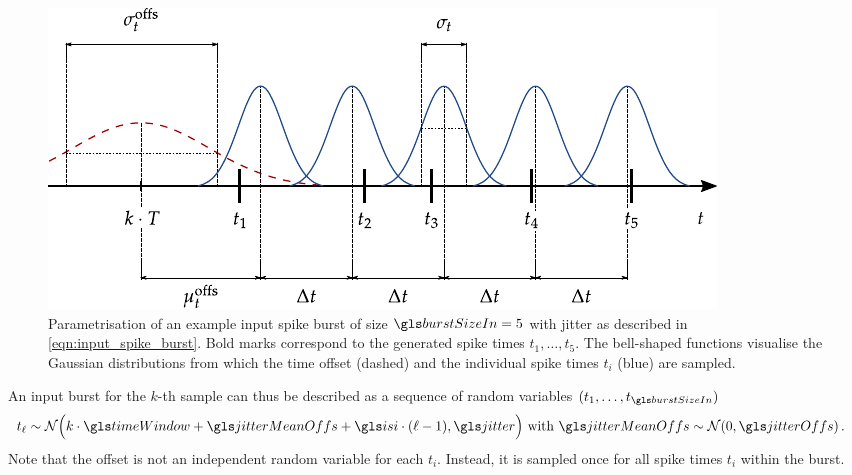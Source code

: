 \begin{figure}
	\centering
	\includegraphics{media/chp3/burst_example.pdf}
	\caption[Parametrisation of an example input spike burst with jitter]{Parametrisation of an example input spike burst of size $\burstSizeIn = 5$ with jitter as described in \cref{eqn:input_spike_burst}. Bold marks correspond to the generated spike times $t_1, \ldots, t_5$. The bell-shaped functions visualise the Gaussian distributions from which the time offset \jitterMeanOffs (dashed) and the individual spike times $t_i$ (blue) are sampled.}
	\label{fig:burst_example}
\end{figure}
An input burst for the $k$-th sample can thus be described as a sequence of \burstSizeIn random variables \((t_1, \ldots, t_{\burstSizeIn})\)
\begin{align}
	t_\ell &\sim \mathcal{N}\Big(k \cdot \timeWindow + \jitterMeanOffs + \isi \cdot (\ell - 1), \jitter\Big) \text{ with } \jitterMeanOffs \sim \mathcal{N}(0, \jitterOffs) \,.
	\label{eqn:input_spike_burst}
\end{align}
Note that the offset \jitterMeanOffs is not an independent random variable for each $t_i$. Instead, it is sampled once for all spike times $t_i$ within the burst.

